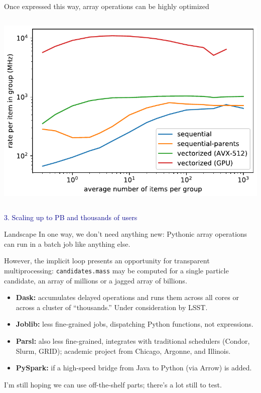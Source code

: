 \documentclass[aspectratio=169]{beamer}
\begin{document}
\begin{frame}{Once expressed this way, array operations can be highly optimized}
\begin{columns}
\includegraphics[width=\linewidth]{max_rates_logy.pdf}
\end{columns}
\end{frame}

\begin{frame}{}
\LARGE
\vspace{1 cm}
\begin{center}
\textcolor{darkblue}{3. Scaling up to PB and thousands of users}
\end{center}
\end{frame}

\begin{frame}{Landscape}
\vspace{0.5 cm}
In one way, we don't need anything new: Pythonic array operations can run in a batch job like anything else.

\vspace{0.5 cm}
However, the implicit loop presents an opportunity for transparent multiprocessing: {\tt\small candidates.mass} may be computed for a single particle candidate, an array of millions or a jagged array of billions.

\vspace{0.25 cm}
\begin{itemize}
\item {\bf Dask:} accumulates delayed operations and runs them across all cores or across a cluster of ``thousands.'' Under consideration by LSST.
\item {\bf Joblib:} less fine-grained jobs, dispatching Python functions, not expressions.
\item {\bf Parsl:} also less fine-grained, integrates with traditional schedulers (Condor, Slurm, GRID); academic project from Chicago, Argonne, and Illinois.
\item {\bf PySpark:} if a high-speed bridge from Java to Python (via Arrow) is added.
\end{itemize}

\vspace{0.25 cm}
I'm still hoping we can use off-the-shelf parts; there's a lot still to test.
\end{frame}
\end{document}
